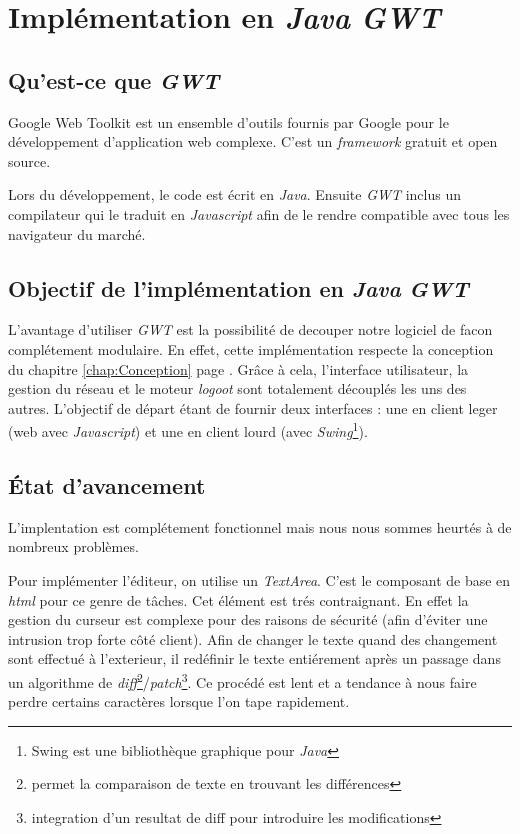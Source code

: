 \section{Implémentation en \emph{Java} \emph{GWT}}
  \label{sec:gwt}
  \subsection{Qu'est-ce que \emph{GWT}}
  Google Web Toolkit est un ensemble d'outils fournis par Google pour le
   développement d'application web complexe. C'est un \emph{framework} gratuit
   et open source.
   
   Lors du développement, le code est écrit en  \emph{Java}. Ensuite \emph{GWT} 
   inclus un compilateur qui le traduit en \emph{Javascript} afin de le rendre 
   compatible avec tous les navigateur du marché.
   
  \subsection{Objectif de l'implémentation en \emph{Java} \emph{GWT}}
  L'avantage d'utiliser \emph{GWT} est la possibilité de decouper notre 
  logiciel de facon complétement modulaire. En effet, cette implémentation respecte la
  conception du chapitre \ref{chap:Conception} page \pageref{chap:Conception}. Grâce à cela, 
  l'interface utilisateur, la gestion du réseau et le moteur \emph{logoot}
  sont totalement découplés les uns des autres. L'objectif de départ étant
  de fournir deux interfaces : une en client leger (web avec \emph{Javascript})
  et une en client lourd (avec \emph{Swing}\footnote{Swing est une bibliothèque
  graphique pour \emph{Java}}). 
  
  \subsection{État d'avancement}
	L'implentation est complétement fonctionnel mais nous nous sommes heurtés
	à de nombreux problèmes.
	
	\label{sec:textarea}
	Pour implémenter l'éditeur, on utilise un \emph{TextArea}. C'est le 
	composant de base en \emph{html} pour ce genre de tâches. Cet élément 
	est trés contraignant. En effet la gestion du curseur est complexe
	pour des raisons de sécurité (afin d'éviter une intrusion trop forte côté 
	client). Afin de changer le texte quand des changement sont effectué à 
	l'exterieur, il redéfinir le texte entiérement après un 
	passage dans un algorithme de \emph{diff}\footnote{permet la comparaison 
	de texte en trouvant les différences}/\emph{patch}\footnote{integration
	d'un resultat de diff pour introduire les modifications}. Ce procédé
	est lent et a tendance à nous faire perdre certains caractères lorsque
	l'on tape rapidement.
	
